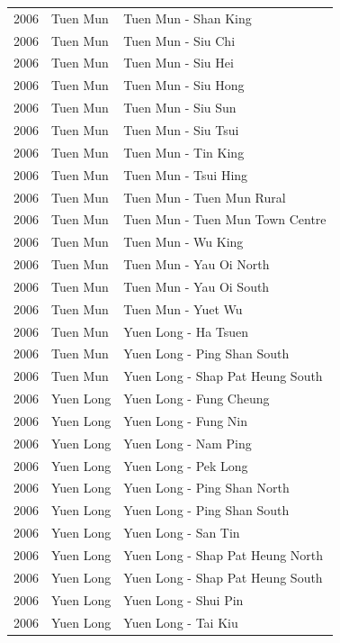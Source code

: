 \begin{longtable}{p{1.2cm}p{3cm}p{7cm}}
2006 & Tuen Mun & Tuen Mun - Shan King \\
2006 & Tuen Mun & Tuen Mun - Siu Chi \\
2006 & Tuen Mun & Tuen Mun - Siu Hei \\
2006 & Tuen Mun & Tuen Mun - Siu Hong \\
2006 & Tuen Mun & Tuen Mun - Siu Sun \\
2006 & Tuen Mun & Tuen Mun - Siu Tsui \\
2006 & Tuen Mun & Tuen Mun - Tin King \\
2006 & Tuen Mun & Tuen Mun - Tsui Hing \\
2006 & Tuen Mun & Tuen Mun - Tuen Mun Rural \\
2006 & Tuen Mun & Tuen Mun - Tuen Mun Town Centre \\
2006 & Tuen Mun & Tuen Mun - Wu King \\
2006 & Tuen Mun & Tuen Mun - Yau Oi North \\
2006 & Tuen Mun & Tuen Mun - Yau Oi South \\
2006 & Tuen Mun & Tuen Mun - Yuet Wu \\
2006 & Tuen Mun & Yuen Long - Ha Tsuen \\
2006 & Tuen Mun & Yuen Long - Ping Shan South \\
2006 & Tuen Mun & Yuen Long - Shap Pat Heung South \\
2006 & Yuen Long & Yuen Long - Fung Cheung \\
2006 & Yuen Long & Yuen Long - Fung Nin \\
2006 & Yuen Long & Yuen Long - Nam Ping \\
2006 & Yuen Long & Yuen Long - Pek Long \\
2006 & Yuen Long & Yuen Long - Ping Shan North \\
2006 & Yuen Long & Yuen Long - Ping Shan South \\
2006 & Yuen Long & Yuen Long - San Tin \\
2006 & Yuen Long & Yuen Long - Shap Pat Heung North \\
2006 & Yuen Long & Yuen Long - Shap Pat Heung South \\
2006 & Yuen Long & Yuen Long - Shui Pin \\
2006 & Yuen Long & Yuen Long - Tai Kiu \\

\end{longtable}